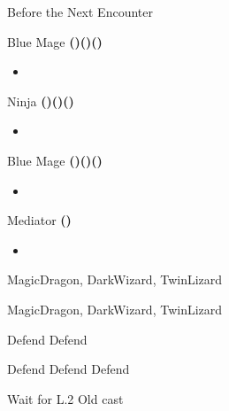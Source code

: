 \begin{paracol}{2}
\switchcolumn
\begin{menu}{Before the Next Encounter}
    \varwb
    \begin{jobMenu}
        \faris Blue Mage \textbf{(\pointDown)(\pointLeft)(\pointDown)} \ability{!\gilToss}
        \begin{itemize}
            \item[] \equip{\iceShield}
        \end{itemize}
        \bartz Ninja \textbf{(\pointLeft)(\pointDown)(\pointLeft)} \ability{!\gilToss}
        \begin{itemize}
            \item[] \equip{\boneMail}
        \end{itemize}
        \lenna Blue Mage \textbf{(\pointDown)(\pointLeft)(\pointDown)} \ability{!\control}
        \begin{itemize}
            \item[] \optimize
        \end{itemize}
        \cara Mediator \textbf{(\pointUp)} \ability{\learning}
        \begin{itemize}
            \item[] \optimize
        \end{itemize}
    \end{jobMenu}
    \begin{itemMenu}
        \hiPotionMenu {}
    \end{itemMenu}
    \varwe
\end{menu}

\switchcolumn*
\begin{steproute}{MagicDragon, DarkWizard, TwinLizard}
\end{steproute}

\switchcolumn
\begin{encounter}{MagicDragon, DarkWizard, TwinLizard}
	\varwb
	\begin{notes}
		\item {}
		\item {}
	\end{notes}
	\begin{round}{1}
		\bartz \leftCommand{\throw} \then \thunderScroll
        \cara Defend
        \faris Defend
        \lenna \rightCommand{\control} \then {}
	\end{round}
    \begin{round}{2}
		\bartz Defend
        \cara Defend
        \faris Defend
        \lenna \ltwoOld
        \item {}
	\end{round}
    \begin{round}{3}
		\bartz Wait for L.2 Old cast \then \rightCommand{\gilToss}
        \cara \leftCommand{\catch}
	\end{round}
	\varwe
\end{encounter}


\end{paracol}
